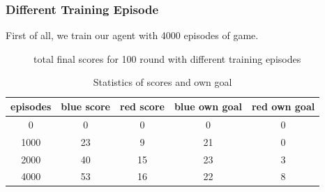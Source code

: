\documentclass[12pt]{article}
\begin{document}
\subsubsection{Different Training Episode}
First of all, we train our agent with 4000 episodes of game.
\begin{figure}[htbp]
	\centering
	\caption{total final scores for 100 round with different training episodes}
\end{figure}

\begin{table}[H]
	\begin{center}
		\begin{tabular}{|c|c|c|c|c|}
			\hline
			episodes  & blue score & red score & blue own goal & red own goal \\ \hline
			0         & 0    & 0    & 0    & 0    \\ \hline
			1000      & 23   & 9    & 21   & 0    \\ \hline
			2000      & 40   & 15   & 23   & 3    \\ \hline
			4000      & 53   & 16   & 22   & 8    \\ \hline
		\end{tabular}
		\caption{Statistics of scores and own goal}
	\end{center}
\end{table}  
 
\end{document}
